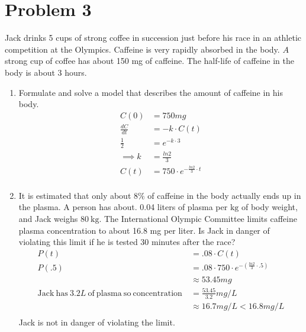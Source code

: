 \documentclass{article}
\begin{document}
\section*{Problem 3} Jack drinks 5 cups of strong coffee in succession just before his race in an athletic competition at the Olympics. Caffeine is very rapidly absorbed in the body. $A$ strong cup of coffee has about 150 mg of caffeine. The half-life of caffeine in the body is about 3 hours.
\begin{enumerate}[label=(\alph*)]
    \item Formulate and solve a model that describes the amount of caffeine in his body.\begin{align*}
        C(0)&=750mg\\
        \frac{dC}{dt}&=-k\cdot C(t)\\
        \frac{1}{2}&=e^{-k\cdot 3}\\
        \implies k&=\frac{ln2}{3}\\
        C(t)&=750\cdot e^{-\frac{ln2}{3}\cdot t}\\
    \end{align*}
    \item It is estimated that only about $8 \%$ of caffeine in the body actually ends up in the plasma. A person has about. 0.04 liters of plasma per $\mathrm{kg}$ of body weight, and Jack weighs $80 \mathrm{~kg}$. The International Olympic Committee limits caffeine plasma concentration to about 16.8 mg per liter. Is Jack in danger of violating this limit if he is tested 30 minutes after the race?\begin{align*}
        P(t)&=.08\cdot C(t)\\
        P(.5)&=.08\cdot750\cdot e^{-(\frac{ln2}{3}\cdot.5)}\\
        &\approx 53.45 mg\\
    \mathrm{Jack~has~}3.2L\mathrm{~of~plasma~so~concentration~}&=\frac{53.45}{3.2}mg/L\\
        &\approx16.7mg/L<16.8mg/L\\
    \end{align*}Jack is not in danger of violating the limit.
\end{enumerate}
\end{document}
